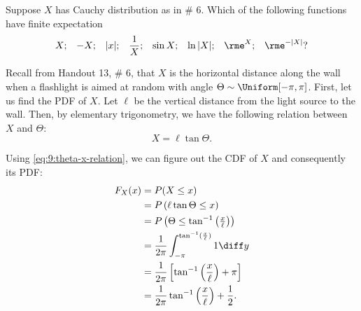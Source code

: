 \begin{problem}[Handout 13, \# 10]
  Suppose \(X\) has Cauchy distribution as in \# 6. Which of the following
  functions have finite expectation
  \[
    \begin{aligned}
      X;&&-X;&&|x|;&&\frac{1}{X};&&\sin X;&&\ln|X|;&&\rme^X;&&\rme^{-|X|}?
    \end{aligned}
  \]
\end{problem}
\begin{solution}
  Recall from Handout 13, \# 6, that \(X\) is the horizontal distance along
  the wall when a flashlight is aimed at random with angle
  \(\Theta\sim\Uniform[-\pi,\pi]\). First, let us find the PDF of
  \(X\). Let \(\ell\) be the vertical distance from the light source to the
  wall. Then, by elementary trigonometry, we have the following relation
  between \(X\) and \(\Theta\):
  \begin{equation}
    \label{eq:9:theta-x-relation}
    X=\ell\tan\Theta.
  \end{equation}

  Using \eqref{eq:9:theta-x-relation}, we can figure out the CDF of \(X\)
  and consequently its PDF:
  \begin{align*}
    F_X(x)
    &=P(X\leq x)\\
    &=P\left(\ell\tan\Theta\leq x\right)\\
    &=P\left(\Theta\leq \tan^{-1}\left(\tfrac{x}{\ell}\right)\right)\\
    &=\frac{1}{2\pi}\int_{-\pi}^{\tan^{-1}(\frac{x}{\ell})} 1\diff y\\
    &=\frac{1}{2\pi}\left[\tan^{-1}\left(\frac{x}{\ell}\right)+\pi\right]\\
    &=\frac{1}{2\pi}\tan^{-1}\left(\frac{x}{\ell}\right)+\frac{1}{2}.
  \end{align*}
\end{solution}
\newpage

